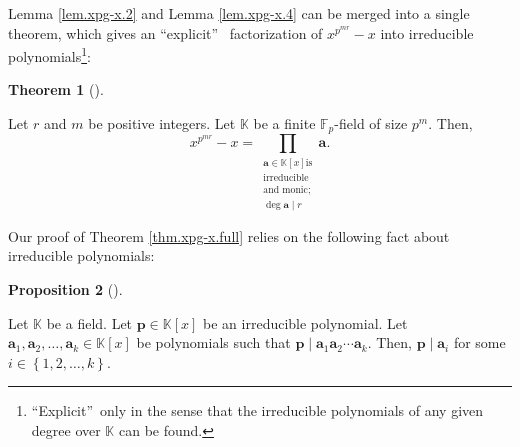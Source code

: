 \documentclass[numbers=enddot,12pt,final,onecolumn,notitlepage]{scrartcl}%
\theoremstyle{definition}
\newtheorem{theo}{Theorem}[subsection]
\newenvironment{theorem}[1][]
{\begin{theo}[#1]\begin{leftbar}}
{\end{leftbar}\end{theo}}
\newtheorem{prop}[theo]{Proposition}
\newenvironment{proposition}[1][]
{\begin{prop}[#1]\begin{leftbar}}
{\end{leftbar}\end{prop}}
\let\prodnonlimits\prod
\renewcommand{\prod}{\prodnonlimits\limits}
\begin{document}
Lemma \ref{lem.xpg-x.2} and Lemma \ref{lem.xpg-x.4} can be merged into a
single theorem, which gives an \textquotedblleft explicit\textquotedblright%
\ factorization of $x^{p^{mr}}-x$ into irreducible
polynomials\footnote{\textquotedblleft Explicit\textquotedblright\ only in the
sense that the irreducible polynomials of any given degree over $\mathbb{K}$
can be found.}:

\begin{theorem}
\label{thm.xpg-x.full}Let $r$ and $m$ be positive integers. Let $\mathbb{K}$
be a finite $\mathbb{F}_{p}$-field of size $p^{m}$. Then,%
\[
x^{p^{mr}}-x=\prod_{\substack{\mathbf{a}\in\mathbb{K}\left[  x\right]  \text{
is}\\\text{irreducible}\\\text{and monic;}\\\deg\mathbf{a}\mid r}}\mathbf{a}.
\]

\end{theorem}

Our proof of Theorem \ref{thm.xpg-x.full} relies on the following fact about
irreducible polynomials:

\begin{proposition}
\label{prop.irredpol.pabk}Let $\mathbb{K}$ be a field. Let $\mathbf{p}%
\in\mathbb{K}\left[  x\right]  $ be an irreducible polynomial. Let
$\mathbf{a}_{1},\mathbf{a}_{2},\ldots,\mathbf{a}_{k}\in\mathbb{K}\left[
x\right]  $ be polynomials such that $\mathbf{p}\mid\mathbf{a}_{1}%
\mathbf{a}_{2}\cdots\mathbf{a}_{k}$. Then, $\mathbf{p}\mid\mathbf{a}_{i}$ for
some $i\in\left\{  1,2,\ldots,k\right\}  $.
\end{proposition}
\end{document}
